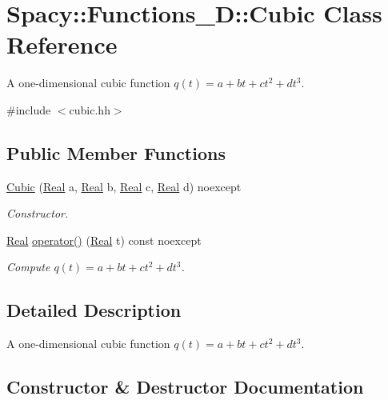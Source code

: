 \hypertarget{classSpacy_1_1Functions__1D_1_1Cubic}{}\section{Spacy\+:\+:Functions\+\_\+D\+:\+:Cubic Class Reference}
\label{classSpacy_1_1Functions__1D_1_1Cubic}


A one-\/dimensional cubic function $q(t) = a + bt + ct^2 + dt^3$.  




{\ttfamily \#include $<$cubic.\+hh$>$}

\subsection*{Public Member Functions}
\begin{DoxyCompactItemize}
\item 
\hyperlink{classSpacy_1_1Functions__1D_1_1Cubic_a02138df0eb7552a66c4d4c4ab1e23771_a02138df0eb7552a66c4d4c4ab1e23771}{Cubic} (\hyperlink{classSpacy_1_1Real}{Real} a, \hyperlink{classSpacy_1_1Real}{Real} b, \hyperlink{classSpacy_1_1Real}{Real} c, \hyperlink{classSpacy_1_1Real}{Real} d) noexcept
\begin{DoxyCompactList}\small\item\em Constructor. \end{DoxyCompactList}\item 
\hyperlink{classSpacy_1_1Real}{Real} \hyperlink{classSpacy_1_1Functions__1D_1_1Cubic_adeb72297c0849ada705f61dbe0f1ea61_adeb72297c0849ada705f61dbe0f1ea61}{operator()} (\hyperlink{classSpacy_1_1Real}{Real} t) const noexcept
\begin{DoxyCompactList}\small\item\em Compute $q(t) = a + bt + ct^2 + dt^3 $. \end{DoxyCompactList}\end{DoxyCompactItemize}


\subsection{Detailed Description}
A one-\/dimensional cubic function $q(t) = a + bt + ct^2 + dt^3$. 

\subsection{Constructor \& Destructor Documentation}
\hypertarget{classSpacy_1_1Functions__1D_1_1Cubic_a02138df0eb7552a66c4d4c4ab1e23771_a02138df0eb7552a66c4d4c4ab1e23771}{}
